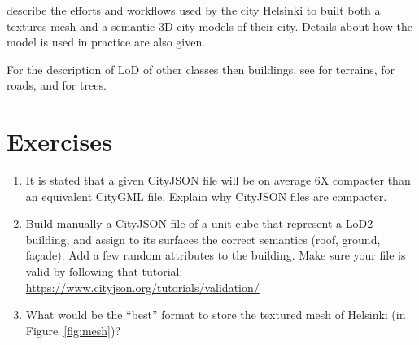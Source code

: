 \citet{Helsinki19} describe the efforts and workflows used by the city Helsinki to built both a textures mesh and a semantic 3D city models of their city. 
Details about how the model is used in practice are also given.

For the description of LoD of other classes then buildings, see \citet{Kumar19} for terrains, \citet{Labetski18} for roads, and \citet{Ortega18} for trees.

%
\section{Exercises}

\begin{enumerate}
  \item It is stated that a given CityJSON file will be on average 6X compacter than an equivalent CityGML file. Explain why CityJSON files are compacter.
  \item Build manually a CityJSON file of a unit cube that represent a LoD2 building, and assign to its surfaces the correct semantics (roof, ground, façade). Add a few random attributes to the building. Make sure your file is valid by following that tutorial: \url{https://www.cityjson.org/tutorials/validation/}
  \item What would be the ``best'' format to store the textured mesh of Helsinki (in Figure~\ref{fig:mesh})?
\end{enumerate}
